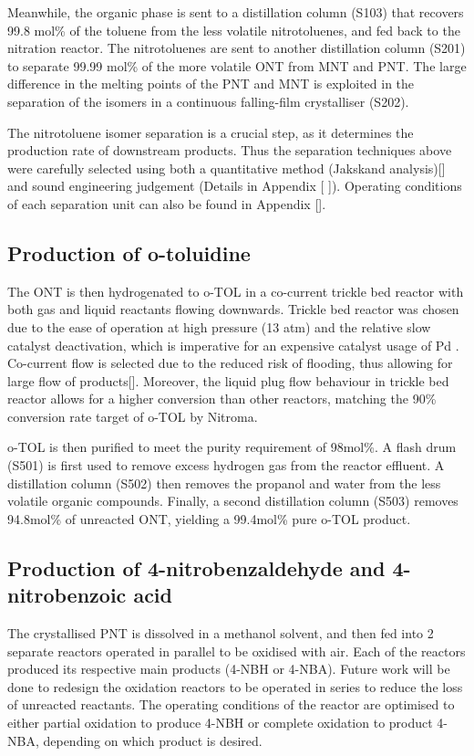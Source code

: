 Meanwhile, the organic phase is sent to a distillation column (S103) that recovers 99.8 mol\% of the toluene from the less volatile nitrotoluenes, and fed back to the nitration reactor. The nitrotoluenes are sent to another distillation column (S201) to separate 99.99 mol\% of the more volatile ONT from MNT and PNT. The large difference in the melting points of the PNT and MNT is exploited in the separation of the isomers in a continuous falling-film crystalliser (S202). 

The nitrotoluene isomer separation is a crucial step, as it determines the production rate of downstream products. Thus the separation techniques above were carefully selected using both a quantitative method (Jakskand analysis)[] and sound engineering judgement (Details in Appendix [ ]). Operating conditions of each separation unit can also be found in Appendix []. 

\subsection{Production of o-toluidine}
The ONT is then hydrogenated to o-TOL in a co-current trickle bed reactor with both gas and liquid reactants flowing downwards. Trickle bed reactor was chosen due to the ease of operation at high pressure (13 atm) and the relative slow catalyst deactivation, which is imperative for an expensive catalyst usage of Pd \cite{vemala_hydrodynamic_nodate}. Co-current flow is selected due to the reduced risk of flooding, thus allowing for large flow of products[]. Moreover, the liquid plug flow behaviour in trickle bed reactor allows for a higher conversion than other reactors, matching the 90\% conversion rate target of o-TOL by Nitroma. 

o-TOL is then purified to meet the purity requirement of 98mol\%. A flash drum (S501) is first used to remove excess hydrogen gas from the reactor effluent. A distillation column (S502) then removes the propanol and water from the less volatile organic compounds. Finally, a second distillation column (S503) removes 94.8mol\% of unreacted ONT, yielding a 99.4mol\% pure o-TOL product.
 
\subsection{Production of 4-nitrobenzaldehyde and 4-nitrobenzoic acid}
The crystallised PNT is dissolved in a methanol solvent, and then fed into 2 separate reactors operated in parallel to be oxidised with air. Each of the reactors produced its respective main products (4-NBH or 4-NBA). Future work will be done to redesign the oxidation reactors to be operated in series to reduce the loss of unreacted reactants. The operating conditions of the reactor are optimised to either partial oxidation to produce 4-NBH or complete oxidation to product 4-NBA, depending on which product is desired.

